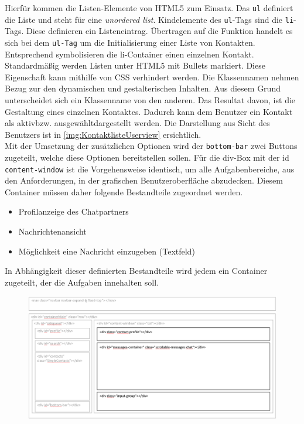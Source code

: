 \documentclass[a4paper,titlepage,halfparskip,12pt]{scrreprt}
\begin{document}
\begin{onehalfspacing}
\begin{figure}[h]
\end{figure}
Hierfür kommen die Listen-Elemente von HTML5 zum Einsatz. Das \texttt{ul} definiert die Liste und steht für eine \textit{unordered list}. Kindelemente des \texttt{ul}-Tags sind die \texttt{li}-Tags. Diese definieren ein Listeneintrag.
Übertragen auf die Funktion handelt es sich bei dem \texttt{ul-Tag} um die Initialisierung einer Liste von Kontakten. Entsprechend symbolisieren die li-Container einen einzelnen Kontakt. Standardmäßig werden Listen unter HTML5 mit Bullets markiert. Diese Eigenschaft kann mithilfe von CSS verhindert werden. Die Klassennamen nehmen Bezug zur den dynamischen und gestalterischen Inhalten. Aus diesem Grund unterscheidet sich ein Klassenname von den anderen. Das Resultat davon, ist die Gestaltung eines einzelnen Kontaktes. Dadurch kann dem Benutzer ein Kontakt als \glqq aktiv\grqq bzw. \glqq ausgewählt\grqq dargestellt werden. Die Darstellung aus Sicht des Benutzers ist in \autoref{img:KontaktlisteUserview} ersichtlich. \cite{w3schoolsUlTag}\\
Mit der Umsetzung der zusätzlichen Optionen wird der \texttt{bottom-bar} zwei Buttons zugeteilt, welche diese Optionen bereitstellen sollen. Für die div-Box mit der id \texttt{content-window} ist die Vorgehensweise identisch, um alle Aufgabenbereiche, aus den Anforderungen, in der grafischen Benutzeroberfläche abzudecken. Diesem Container müssen daher folgende Bestandteile zugeordnet werden.
\begin{itemize}
	\item Profilanzeige des Chatpartners
	\item Nachrichtenansicht
	\item Möglichkeit eine Nachricht einzugeben (Textfeld)
\end{itemize}
In Abhängigkeit dieser definierten Bestandteile wird jedem ein Container zugeteilt, der die Aufgaben innehalten soll.
\begin{figure}[h]
	\centering
	\includegraphics[scale=0.60]{images/BasisStruktur1GochatContentWindow}

\end{figure}
\end{onehalfspacing}
\end{document}
